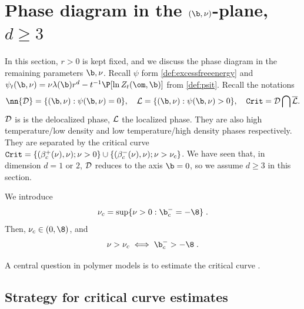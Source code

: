  \chapter{Phase diagram in the $(\b, \nu)$-plane, $d\geq 3$} \label{ch:PD}
 
 In this section, $r>0$ is kept fixed, and we discuss the phase diagram in the remaining parameters $\b, \nu$. 
 Recall $\psi$ form \eqref{def:excessfreeenergy} and $\psi_t(\b,\nu)= \nu \lambda(\b) r^d - t^{-1} \P[ \ln Z_t(\om, \b)]$ from \eqref{def:psit}. Recall the notations
 \begin{equation} \nn
 {\cal D} = \{ (\b,\nu): \psi(\b, \nu)=0 \}, \quad {\cal L}  = \{ (\b,\nu): \psi(\b, \nu)>0\}, \quad {\tt Crit} = {\cal D} \bigcap \overline{\cal L}.
\end{equation}
$\cal D$ is is the delocalized phase, $\cal L$ the localized phase.%
They are also high temperature/low density and low temperature/high density phases respectively.
They are separated by the critical curve ${\tt Crit} =\{(\beta_c^+(\nu), \nu); \nu >0\} \cup \{(\beta_c^-(\nu), \nu); \nu > \nu_c\}$. %
 We have seen that, in dimension $d=1$ or $ 2$,  ${\cal D}$ reduces to the axis $\b=0$, so  we assume $d \geq 3$ in this section.
 
 We introduce  
  \begin{equation}\label{def:nuc}
 \nu_c = \sup\{ \nu >0: \b_c^- = -\8\}\;.
\end{equation}
Then, $ \nu_c \in (0, \8)$, and 
$$
\nu > \nu_c \iff \b_c^- > -\8 \;.
$$
 
 
 A central question in polymer models is to estimate the critical curve \cite{dHollanderStFl, Giacomin}. 
 
 \section{Strategy for critical curve estimates}
 
